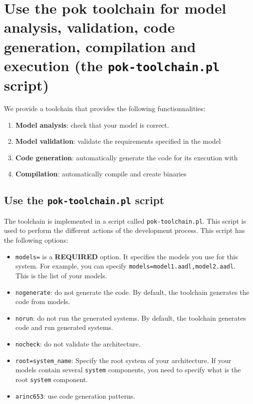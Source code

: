    \section{Use the pok toolchain for model analysis, validation, code generation, compilation and execution (the \texttt{pok-toolchain.pl} script)}
   We provide a toolchain that provides the following functionnalities:
   \begin{enumerate}
      \item
         \textbf{Model analysis}: check that your \aadl model is correct.
      \item
         \textbf{Model validation}: validate the requirements specified in the model
      \item
         \textbf{Code generation}: automatically generate the code for its execution with
         \pok
      \item
         \textbf{Compilation}: automatically compile and create binaries
   \end{enumerate}


      \subsection{Use the \texttt{pok-toolchain.pl} script}
      The toolchain is implemented in a script called \texttt{pok-toolchain.pl}.
      This script is used to perform the different actions of the development
      process. This script has the following options:
      \begin{itemize}
         \item
            \texttt{\-\-models=} is a \textbf{REQUIRED} option. It specifies the
            \aadl models you use for this system. For example, you can specify
            \texttt{\-\-models=model1.aadl,model2.aadl}. This is the list of
            your models.
         \item
            \texttt{\-\-no\-generate}: do not generate the code. By default, the
            toolchain generates the code from \aadl models.
         \item
            \texttt{\-\-no\-run}: do not run the generated systems. By default,
            the toolchain generates code and run generated systems.
         \item
            \texttt{\-\-no\-check}: do not validate the architecture.
         \item
            \texttt{\-\-root=system\_name}: Specify the root system of your
            architecture. If your models contain several \texttt{system}
            components, you need to specify what is the \aadl root
            \texttt{system} component.
         \item
            \texttt{\-\-arinc653}: use \arinc code generation patterns.
      \end{itemize}

